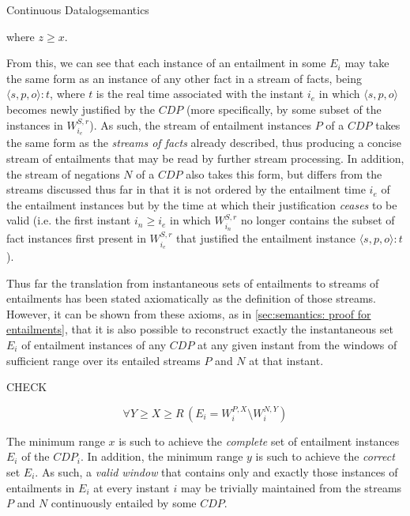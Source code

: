 \begin{nestedsection}{Continuous Datalog}{semantics}
\begin{axiom}
\noindent where $z \geq x$.
\end{axiom}

From this, we can see that each instance of an entailment in some
$E_{i}$ may take the same form as an instance of any other fact in a
stream of facts, being $\langle s, p, o \rangle \! : \!t$, where $t$ is
the real time associated with the instant $i_{e}$ in which
$\langle s, p, o \rangle$ becomes newly justified by the ${CDP}$ (more
specifically, by some subset of the instances in $W^{S,r}_{i_{e}}$).
As such, the stream of entailment instances $P$ of a ${CDP}$ takes
the same form as the \emph{streams of facts} already described, thus
producing a concise stream of entailments that may be read by
further stream processing.  In addition, the stream of negations $N$
of a ${CDP}$ also takes this form, but differs from the streams
discussed thus far in that it is not ordered by the entailment time
$i_{e}$ of the entailment instances but by the time at which their
justification \emph{ceases} to be valid (i.e. the first instant
${i_{n} \geq i_{e}}$ in which $W^{S,r}_{i_{n}}$ no longer contains
the subset of fact instances first present in $W^{S,r}_{i_{e}}$ that
justified the entailment instance $\langle s, p, o \rangle \! : \!t$).

Thus far the translation from instantaneous sets of entailments to
streams of entailments has been stated axiomatically as the definition
of those streams.  However, it can be shown from these axioms, as in
\ref{sec:semantics: proof for entailments}, that it is also possible
to reconstruct exactly the instantaneous set $E_{i}$ of entailment
instances of any ${CDP}$ at any given instant from the windows of
sufficient range over its entailed streams $P$ and $N$ at that
instant.

CHECK

\[ \forall Y \geq X \geq R \, \left( E_{i} = W^{P,X}_{i} \setminus W^{N,Y}_{i} \right) \]

The minimum range $x$ is such to achieve the \emph{complete} set of
entailment instances $E_{i}$ of the ${CDP}_{i}$.  In addition, the
minimum range $y$ is such to achieve the \emph{correct} set $E_{i}$.
As such, a \emph{valid window} that contains only and exactly those
instances of entailments in $E_{i}$ at every instant $i$ may be
trivially maintained from the streams $P$ and $N$ continuously
entailed by some ${CDP}$.
\end{nestedsection}
